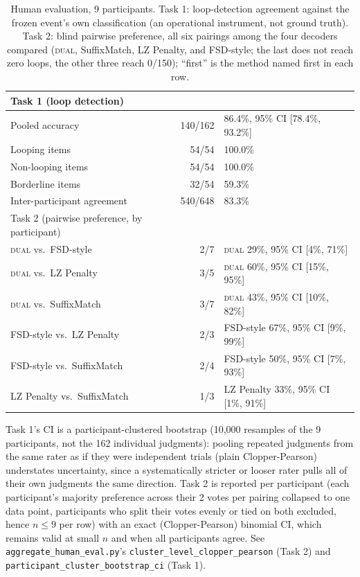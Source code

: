 \documentclass[make,article,submit,pdftex]{Definitions/mdpi}
\begin{document}
\begin{table}[H]
\centering
\caption{Human evaluation, 9 participants. Task 1: loop-detection agreement against the frozen event's own classification (an operational instrument, not ground truth). Task 2: blind pairwise preference, all six pairings among the four decoders compared (\textsc{dual}, SuffixMatch, LZ Penalty, and FSD-style; the last does not reach zero loops, the other three reach 0/150); ``first'' is the method named first in each row.}
\label{tab:humaneval}
\begin{tabular}{@{}lrl@{}}
\toprule
Task 1 (loop detection) & & \\
\midrule
Pooled accuracy & 140/162 & 86.4\%, 95\% CI [78.4\%, 93.2\%] \\
\quad Looping items & 54/54 & 100.0\% \\
\quad Non-looping items & 54/54 & 100.0\% \\
\quad Borderline items & 32/54 & 59.3\% \\
Inter-participant agreement & 540/648 & 83.3\% \\
\midrule
Task 2 (pairwise preference, by participant) & & \\
\midrule
\textsc{dual} vs.\ FSD-style & 2/7 & \textsc{dual} 29\%, 95\% CI [4\%, 71\%] \\
\textsc{dual} vs.\ LZ Penalty & 3/5 & \textsc{dual} 60\%, 95\% CI [15\%, 95\%] \\
\textsc{dual} vs.\ SuffixMatch & 3/7 & \textsc{dual} 43\%, 95\% CI [10\%, 82\%] \\
FSD-style vs.\ LZ Penalty & 2/3 & FSD-style 67\%, 95\% CI [9\%, 99\%] \\
FSD-style vs.\ SuffixMatch & 2/4 & FSD-style 50\%, 95\% CI [7\%, 93\%] \\
LZ Penalty vs.\ SuffixMatch & 1/3 & LZ Penalty 33\%, 95\% CI [1\%, 91\%] \\
\bottomrule
\end{tabular}

\vspace{4pt}
{\footnotesize Task 1's CI is a participant-clustered bootstrap (10,000 resamples of the 9 participants, not the 162 individual judgments): pooling repeated judgments from the same rater as if they were independent trials (plain Clopper-Pearson) understates uncertainty, since a systematically stricter or looser rater pulls all of their own judgments the same direction. Task 2 is reported per participant (each participant's majority preference across their 2 votes per pairing collapsed to one data point, participants who split their votes evenly or tied on both excluded, hence $n\le9$ per row) with an exact (Clopper-Pearson) binomial CI, which remains valid at small $n$ and when all participants agree. See \texttt{aggregate\_\allowbreak{}human\_\allowbreak{}eval.py}'s \texttt{cluster\_\allowbreak{}level\_\allowbreak{}clopper\_\allowbreak{}pearson} (Task 2) and \texttt{participant\_\allowbreak{}cluster\_\allowbreak{}bootstrap\_\allowbreak{}ci} (Task 1).}
\end{table}
\end{document}
